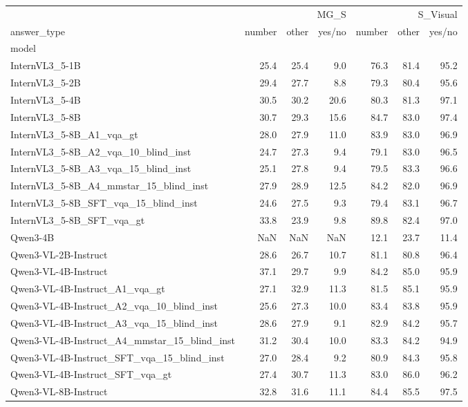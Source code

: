 \begin{tabular}{lrrrrrr}
\toprule
 & \multicolumn{3}{r}{MG_S} & \multicolumn{3}{r}{S_Visual} \\
answer_type & number & other & yes/no & number & other & yes/no \\
model &  &  &  &  &  &  \\
\midrule
InternVL3_5-1B & 25.4 & 25.4 & 9.0 & 76.3 & 81.4 & 95.2 \\
InternVL3_5-2B & 29.4 & 27.7 & 8.8 & 79.3 & 80.4 & 95.6 \\
InternVL3_5-4B & 30.5 & 30.2 & 20.6 & 80.3 & 81.3 & 97.1 \\
InternVL3_5-8B & 30.7 & 29.3 & 15.6 & 84.7 & 83.0 & 97.4 \\
InternVL3_5-8B_A1_vqa_gt & 28.0 & 27.9 & 11.0 & 83.9 & 83.0 & 96.9 \\
InternVL3_5-8B_A2_vqa_10_blind_inst & 24.7 & 27.3 & 9.4 & 79.1 & 83.0 & 96.5 \\
InternVL3_5-8B_A3_vqa_15_blind_inst & 25.1 & 27.8 & 9.4 & 79.5 & 83.3 & 96.6 \\
InternVL3_5-8B_A4_mmstar_15_blind_inst & 27.9 & 28.9 & 12.5 & 84.2 & 82.0 & 96.9 \\
InternVL3_5-8B_SFT_vqa_15_blind_inst & 24.6 & 27.5 & 9.3 & 79.4 & 83.1 & 96.7 \\
InternVL3_5-8B_SFT_vqa_gt & 33.8 & 23.9 & 9.8 & 89.8 & 82.4 & 97.0 \\
Qwen3-4B & NaN & NaN & NaN & 12.1 & 23.7 & 11.4 \\
Qwen3-VL-2B-Instruct & 28.6 & 26.7 & 10.7 & 81.1 & 80.8 & 96.4 \\
Qwen3-VL-4B-Instruct & 37.1 & 29.7 & 9.9 & 84.2 & 85.0 & 95.9 \\
Qwen3-VL-4B-Instruct_A1_vqa_gt & 27.1 & 32.9 & 11.3 & 81.5 & 85.1 & 95.9 \\
Qwen3-VL-4B-Instruct_A2_vqa_10_blind_inst & 25.6 & 27.3 & 10.0 & 83.4 & 83.8 & 95.9 \\
Qwen3-VL-4B-Instruct_A3_vqa_15_blind_inst & 28.6 & 27.9 & 9.1 & 82.9 & 84.2 & 95.7 \\
Qwen3-VL-4B-Instruct_A4_mmstar_15_blind_inst & 31.2 & 30.4 & 10.0 & 83.3 & 84.2 & 94.9 \\
Qwen3-VL-4B-Instruct_SFT_vqa_15_blind_inst & 27.0 & 28.4 & 9.2 & 80.9 & 84.3 & 95.8 \\
Qwen3-VL-4B-Instruct_SFT_vqa_gt & 27.4 & 30.7 & 11.3 & 83.0 & 86.0 & 96.2 \\
Qwen3-VL-8B-Instruct & 32.8 & 31.6 & 11.1 & 84.4 & 85.5 & 97.5 \\

\end{tabular}

